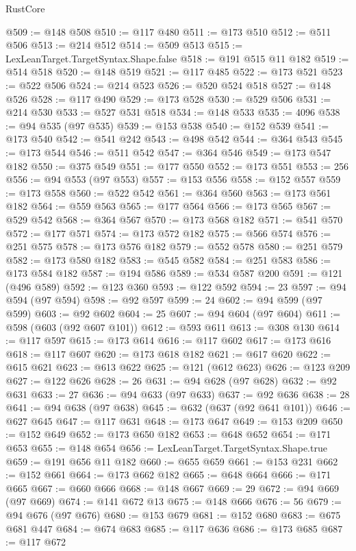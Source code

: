 \begin{lexlean}{RustCore}
\begin{coremodule}
@509 := @148 @508
@510 := @117 @480
@511 := @173 @510
@512 := @511 @506
@513 := @214 @512
@514 := @509 @513
@515 := LexLeanTarget.TargetSyntax.Shape.false
@518 := @191 @515 @11 @182
@519 := @514 @518
@520 := @148 @519
@521 := @117 @485
@522 := @173 @521
@523 := @522 @506
@524 := @214 @523
@526 := @520 @524 @518
@527 := @148 @526
@528 := @117 @490
@529 := @173 @528
@530 := @529 @506
@531 := @214 @530
@533 := @527 @531 @518
@534 := @148 @533
@535 := 4096
@538 := @94 @535 (@97 @535)
@539 := @153 @538
@540 := @152 @539
@541 := @173 @540
@542 := @541 @242
@543 := @498 @542
@544 := @364 @543
@545 := @173 @544
@546 := @511 @542
@547 := @364 @546
@549 := @173 @547 @182
@550 := @375 @549
@551 := @177 @550
@552 := @173 @551
@553 := 256
@556 := @94 @553 (@97 @553)
@557 := @153 @556
@558 := @152 @557
@559 := @173 @558
@560 := @522 @542
@561 := @364 @560
@563 := @173 @561 @182
@564 := @559 @563
@565 := @177 @564
@566 := @173 @565
@567 := @529 @542
@568 := @364 @567
@570 := @173 @568 @182
@571 := @541 @570
@572 := @177 @571
@574 := @173 @572 @182
@575 := @566 @574
@576 := @251 @575
@578 := @173 @576 @182
@579 := @552 @578
@580 := @251 @579
@582 := @173 @580 @182
@583 := @545 @582
@584 := @251 @583
@586 := @173 @584 @182
@587 := @194 @586
@589 := @534 @587 @200
@591 := @121 (@496 @589)
@592 := @123 @360
@593 := @122 @592
@594 := 23
@597 := @94 @594 (@97 @594)
@598 := @92 @597
@599 := 24
@602 := @94 @599 (@97 @599)
@603 := @92 @602
@604 := 25
@607 := @94 @604 (@97 @604)
@611 := @598 (@603 (@92 @607 @101))
@612 := @593 @611
@613 := @308 @130
@614 := @117 @597
@615 := @173 @614
@616 := @117 @602
@617 := @173 @616
@618 := @117 @607
@620 := @173 @618 @182
@621 := @617 @620
@622 := @615 @621
@623 := @613 @622
@625 := @121 (@612 @623)
@626 := @123 @209
@627 := @122 @626
@628 := 26
@631 := @94 @628 (@97 @628)
@632 := @92 @631
@633 := 27
@636 := @94 @633 (@97 @633)
@637 := @92 @636
@638 := 28
@641 := @94 @638 (@97 @638)
@645 := @632 (@637 (@92 @641 @101))
@646 := @627 @645
@647 := @117 @631
@648 := @173 @647
@649 := @153 @209
@650 := @152 @649
@652 := @173 @650 @182
@653 := @648 @652
@654 := @171 @653
@655 := @148 @654
@656 := LexLeanTarget.TargetSyntax.Shape.true
@659 := @191 @656 @11 @182
@660 := @655 @659
@661 := @153 @231
@662 := @152 @661
@664 := @173 @662 @182
@665 := @648 @664
@666 := @171 @665
@667 := @660 @666
@668 := @148 @667
@669 := 29
@672 := @94 @669 (@97 @669)
@674 := @141 @672 @13
@675 := @148 @666
@676 := 56
@679 := @94 @676 (@97 @676)
@680 := @153 @679
@681 := @152 @680
@683 := @675 @681 @447
@684 := @674 @683
@685 := @117 @636
@686 := @173 @685
@687 := @117 @672

\end{coremodule}
\end{lexlean}
